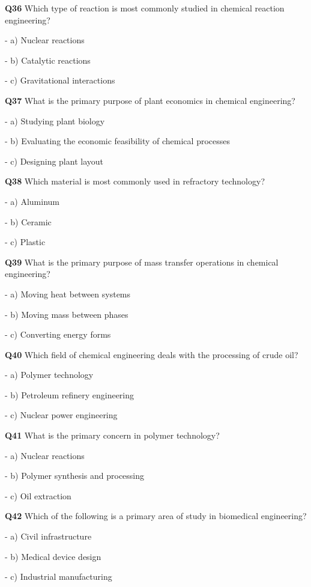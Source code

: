 \textbf{Q36} Which type of reaction is most commonly studied in chemical reaction engineering?\par
\quad - a) Nuclear reactions\par
\quad - b) Catalytic reactions\par
\quad - c) Gravitational interactions\par

\textbf{Q37} What is the primary purpose of plant economics in chemical engineering?\par
\quad - a) Studying plant biology\par
\quad - b) Evaluating the economic feasibility of chemical processes\par
\quad - c) Designing plant layout\par

\textbf{Q38} Which material is most commonly used in refractory technology?\par
\quad - a) Aluminum\par
\quad - b) Ceramic\par
\quad - c) Plastic\par

\textbf{Q39} What is the primary purpose of mass transfer operations in chemical engineering?\par
\quad - a) Moving heat between systems\par
\quad - b) Moving mass between phases\par
\quad - c) Converting energy forms\par

\textbf{Q40} Which field of chemical engineering deals with the processing of crude oil?\par
\quad - a) Polymer technology\par
\quad - b) Petroleum refinery engineering\par
\quad - c) Nuclear power engineering\par

\textbf{Q41} What is the primary concern in polymer technology?\par
\quad - a) Nuclear reactions\par
\quad - b) Polymer synthesis and processing\par
\quad - c) Oil extraction\par

\textbf{Q42} Which of the following is a primary area of study in biomedical engineering?\par
\quad - a) Civil infrastructure\par
\quad - b) Medical device design\par
\quad - c) Industrial manufacturing\par

